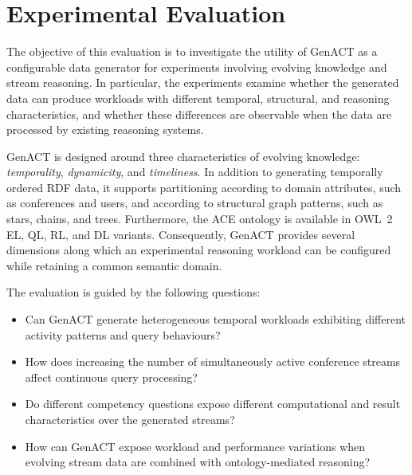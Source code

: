 \section{Experimental Evaluation}
\label{sec:genact-evaluation}

The objective of this evaluation is to investigate the utility of GenACT as a
configurable data generator for experiments involving evolving knowledge and
stream reasoning. In particular, the experiments examine whether the generated
data can produce workloads with different temporal, structural, and reasoning
characteristics, and whether these differences are observable when the data are
processed by existing reasoning systems.

GenACT is designed around three characteristics of evolving knowledge:
\emph{temporality}, \emph{dynamicity}, and \emph{timeliness}. In addition to
generating temporally ordered RDF data, it supports partitioning according to
domain attributes, such as conferences and users, and according to structural
graph patterns, such as stars, chains, and trees. Furthermore, the ACE ontology
is available in OWL~2 EL, QL, RL, and DL variants. Consequently, GenACT
provides several dimensions along which an experimental reasoning workload can
be configured while retaining a common semantic domain.

The evaluation is guided by the following questions:

\begin{itemize}

    \item[\textbf{Q1.}] Can GenACT generate heterogeneous temporal workloads
    exhibiting different activity patterns and query behaviours?

    \item[\textbf{Q2.}] How does increasing the number of simultaneously active
    conference streams affect continuous query processing?

    \item[\textbf{Q3.}] Do different competency questions expose different
    computational and result characteristics over the generated streams?

    \item[\textbf{Q4.}] How can GenACT expose workload and performance
    variations when evolving stream data are combined with ontology-mediated
    reasoning?

\end{itemize}

